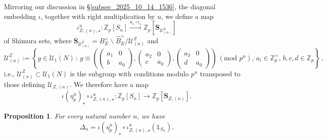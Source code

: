 \documentclass{amsart}
\numberwithin{equation}{section}
\newtheorem{proposition}[theorem]{Proposition}
\newcommand{\Zp}{\mathbb{Z}_p}
\begin{document}
Mirroring our discussion in \S \ref{subsec_2025_10_14_1536}, the diagonal embedding $\iota$, together with right multiplication by $u$, we define a map 
$$\iota_{Z,(n),\star}^u : \Zp[S_n] \xrightarrow{u_\star \circ \iota_\star} \Zp[\mathbf{S}_{\mathcal{U}^Z_{(n)}}]$$
of Shimura sets, where $\mathbf{S}_{\mathcal{U}^Z_{(n)}} = B_E^\times \backslash \widehat{B}_E^\times / {\mathcal{U}^Z_{(n)}}$ and 
\[\mathcal{U}^Z_{(n)}:=\left \{ g \in \mathcal{U}_1(N)\,:\, g \equiv \left(\left( \begin{smallmatrix}  a_1 & 0 \\ b & a_0 \end{smallmatrix}\right),\left( \begin{smallmatrix}  a_2 & 0 \\ c & a_0 \end{smallmatrix}\right),\left( \begin{smallmatrix} a_3 & 0 \\ d & a_0 \end{smallmatrix}\right)\right)\, (\text{mod }p^n),\,a_i \in\Zp^\times, \, b,c,d \in\Zp\right\}\,,\] 
i.e., ${\mathcal{U}^Z_{(n)}}\subset \mathcal{U}_1(N)$ is the subgroup with conditions modulo $p^n$ transposed to those defining ${\mathcal{U}_{Z,(n)}}$. We therefore have a map
\[ \iota(\eta^n_p)_\star \circ  \iota_{Z,(n),\star}^u: \Zp[S_n] \longrightarrow \Zp[\mathbf{S}_{Z,(n)}]. \] 


\begin{proposition}\label{prop_rewriting_Hsieh}
For every natural number $n$, we have 
$$\Delta_n  = \iota(\eta_p^n)_\star \circ \iota_{Z,(n),\star}^u\left(\mathbb{1}_{S_n}\right).$$     
\end{proposition}
\end{document}
